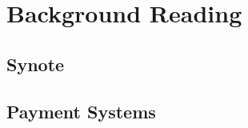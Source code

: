 \chapter{Background Reading}
\label{chap:background-reading}

\section{Synote}
\label{sec:synote}

\section{Payment Systems}
\label{sec:payment-systems}